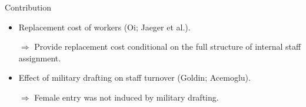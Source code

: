 \begin{frame}{Contribution}
    \begin{itemize}[<+->]
        \item Replacement cost of workers (Oi; Jaeger et al.).
        
        $\Rightarrow$ Provide replacement cost conditional on the full structure of internal staff assignment.

        \item Effect of military drafting on staff turnover (Goldin; Acemoglu).

        $\Rightarrow$ Female entry was not induced by military drafting.

    \end{itemize}
\end{frame}